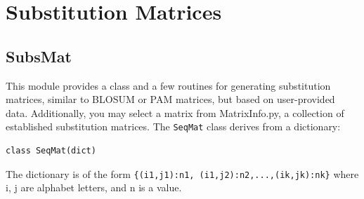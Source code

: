 \documentclass{report}
\begin{document}
\section{Substitution Matrices}

\subsection{SubsMat}

This module provides a class and a few routines for generating substitution matrices, similar to BLOSUM or PAM matrices, but based on user-provided data. Additionally, you may select a matrix from MatrixInfo.py, a collection of established substitution matrices. The \verb+SeqMat+ class derives from a dictionary:
\begin{verbatim}
class SeqMat(dict)
\end{verbatim}
The dictionary is of the form \verb|{(i1,j1):n1, (i1,j2):n2,...,(ik,jk):nk}| where i, j are alphabet letters, and n is a value.
\end{document}
